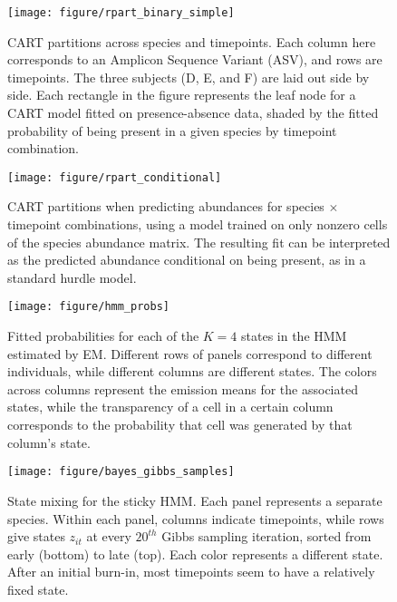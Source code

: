 \documentclass{article}
\begin{document}
\begin{figure}[ht]
  \centering
  \caption{\label{fig:label} }
\end{figure}

\begin{figure}[ht]
  \centering
  \caption{\label{fig:rpart_complex_3} }
\end{figure}

\begin{figure}[ht]
  \centering
  \texttt{[image: figure/rpart\_binary\_simple]}
  \caption{CART partitions across species and timepoints. Each column here
    corresponds to an Amplicon Sequence Variant (ASV), and rows are timepoints.
    The three subjects (D, E, and F) are laid out side by side. Each rectangle
    in the figure represents the leaf node for a CART model fitted on
    presence-absence data, shaded by the fitted probability of being present in
    a given species by timepoint combination.
    \label{fig:rpart_binary_simple}}
\end{figure}

\begin{figure}[ht]
  \centering
  \texttt{[image: figure/rpart\_conditional]}
  \caption{CART partitions when predicting abundances for species $\times$
    timepoint combinations, using a model trained on only nonzero cells of the
    species abundance matrix. The resulting fit can be interpreted as the
    predicted abundance conditional on being present, as in a standard hurdle
    model. \label{fig:rpart_conditional} }
\end{figure}

\begin{figure}[ht]
  \centering
  \texttt{[image: figure/hmm\_probs]}
  \caption{Fitted probabilities for each of the $K = 4$ states in the HMM
    estimated by EM. Different rows of panels correspond to different
    individuals, while different columns are different states. The colors across
    columns represent the emission means for the associated states, while the
    transparency of a cell in a certain column corresponds to the probability
    that cell was generated by that column's state. \label{fig:hmm_probs} }
\end{figure}

\begin{figure}[ht]
  \centering
  \texttt{[image: figure/bayes\_gibbs\_samples]}
  \caption{State mixing for the sticky HMM. Each panel represents a separate
    species. Within each panel, columns indicate timepoints, while rows give
    states $z_{it}$ at every $20^{th}$ Gibbs sampling iteration, sorted from
    early (bottom) to late (top). Each color represents a different state. After
    an initial burn-in, most timepoints seem to have a relatively fixed
    state. \label{fig:bayes_gibbs_samples} }
\end{figure}
\end{document}
